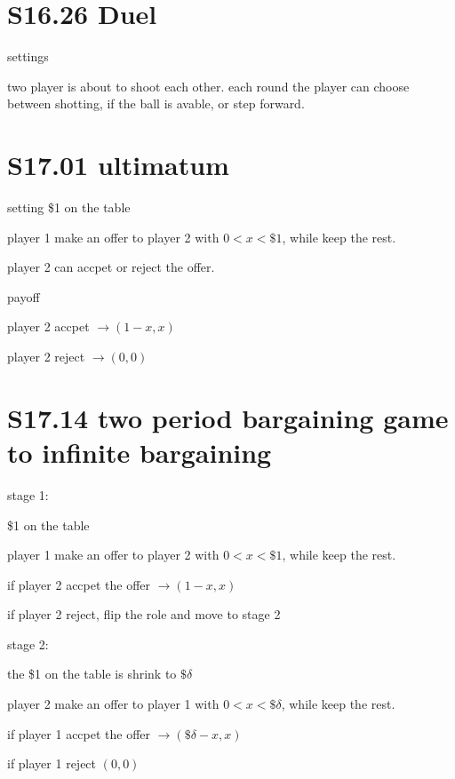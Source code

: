\documentclass[12pt,a4paper]{article}
\begin{document}
\section{S16.26 Duel}
settings

two player is about to shoot each other. each round the player can choose between shotting, if the ball is avable, or step forward.


\section{S17.01 ultimatum}
setting
\$1 on the table

player 1 make an offer to player 2 with $0<x<\$1$, while keep the rest.

player 2 can accpet or reject the offer.

\noindent payoff

player 2 accpet $\rightarrow (1-x,x)$

player 2 reject $\rightarrow (0,0)$

\section{S17.14 two period bargaining game to infinite bargaining}
\noindent stage 1:

\$1 on the table

player 1 make an offer to player 2 with $0<x<\$1$, while keep the rest.

if player 2 accpet the offer  $\rightarrow (1-x,x)$

if player 2 reject, flip the role and move to stage 2

\noindent stage 2:

the \$1 on the table is shrink to $\$\delta$

player 2 make an offer to player 1 with $0<x<\$\delta$, while keep the rest.

if player 1 accpet the offer  $\rightarrow (\$\delta-x,x)$

if player 1 reject $(0,0)$
\end{document}
